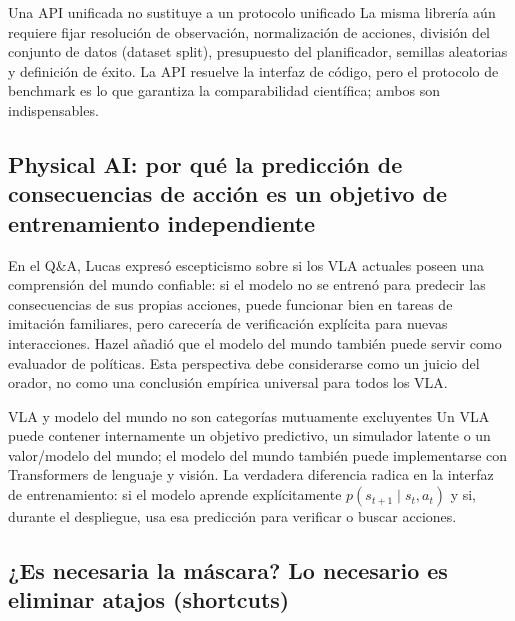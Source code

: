 \documentclass[a4paper]{article}
\begin{document}
\begin{importantbox}{Una API unificada no sustituye a un protocolo unificado}
La misma librería aún requiere fijar resolución de observación, normalización de acciones, división del conjunto de datos (dataset split), presupuesto del planificador, semillas aleatorias y definición de éxito. La API resuelve la interfaz de código, pero el protocolo de benchmark es lo que garantiza la comparabilidad científica; ambos son indispensables.
\end{importantbox}

\subsection{Physical AI: por qué la predicción de consecuencias de acción es un objetivo de entrenamiento independiente}

En el Q\&A, Lucas expresó escepticismo sobre si los VLA actuales poseen una comprensión del mundo confiable: si el modelo no se entrenó para predecir las consecuencias de sus propias acciones, puede funcionar bien en tareas de imitación familiares, pero carecería de verificación explícita para nuevas interacciones. Hazel añadió que el modelo del mundo también puede servir como evaluador de políticas. Esta perspectiva debe considerarse como un juicio del orador, no como una conclusión empírica universal para todos los VLA.


\begin{warningbox}{VLA y modelo del mundo no son categorías mutuamente excluyentes}
Un VLA puede contener internamente un objetivo predictivo, un simulador latente o un valor/modelo del mundo; el modelo del mundo también puede implementarse con Transformers de lenguaje y visión. La verdadera diferencia radica en la interfaz de entrenamiento: si el modelo aprende explícitamente $p(s_{t+1}\mid s_t,a_t)$ y si, durante el despliegue, usa esa predicción para verificar o buscar acciones.
\end{warningbox}

\subsection{¿Es necesaria la máscara? Lo necesario es eliminar atajos (shortcuts)}
\end{document}
